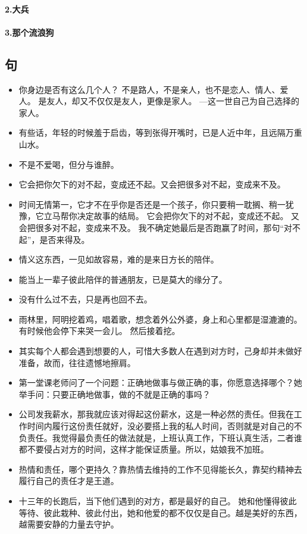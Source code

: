 \documentclass[UTF8,a4paper,8pt]{ctexbook}
\begin{document}
			 \paragraph{2.大兵}
			 \paragraph{3.那个流浪狗}
		 \subsection{句}
			\begin{itemize}
				\item 你身边是否有这么几个人？ 不是路人，不是亲人，也不是恋人、情人、爱人。 是友人，却又不仅仅是友人，更像是家人。 —这一世自己为自己选择的家人。
				\item 有些话，年轻的时候羞于启齿，等到张得开嘴时，已是人近中年，且远隔万重山水。
				\item 不是不爱喝，但分与谁醉。
				\item 它会把你欠下的对不起，变成还不起。又会把很多对不起，变成来不及。
				\item 时间无情第一，它才不在乎你是否还是一个孩子，你只要稍一耽搁、稍一犹豫，它立马帮你决定故事的结局。 它会把你欠下的对不起，变成还不起。 又会把很多对不起，变成来不及。 我不确定她最后是否跑赢了时间，那句“对不起”，是否来得及。
				\item 情义这东西，一见如故容易，难的是来日方长的陪伴。
				\item 能当上一辈子彼此陪伴的普通朋友，已是莫大的缘分了。
				\item 没有什么过不去，只是再也回不去。
				\item 雨林里，阿明挖着鸡，唱着歌，想念着外公外婆，身上和心里都是湿漉漉的。 有时候他会停下来哭一会儿。 然后接着挖。
				\item 其实每个人都会遇到想要的人，可惜大多数人在遇到对方时，己身却并未做好准备，故而，往往遗憾地擦肩。
				\item 第一堂课老师问了一个问题：正确地做事与做正确的事，你愿意选择哪个？她举手问：只要正确地做事，做的不就是正确的事吗？ 
				\item 公司发我薪水，那我就应该对得起这份薪水，这是一种必然的责任。但我在工作时间内履行这份责任就好，没必要搭上我的私人时间，否则就是对自己的不负责任。我觉得最负责任的做法就是，上班认真工作，下班认真生活，二者谁都不要侵占对方的时间，这样才能保证质量。所以，姑娘我不加班。
				\item 热情和责任，哪个更持久？靠热情去维持的工作不见得能长久，靠契约精神去履行自己的责任才是王道。
				\item 十三年的长跑后，当下他们遇到的对方，都是最好的自己。 她和他懂得彼此等待、彼此栽种、彼此付出，她和他爱的都不仅仅是自己。越是美好的东西，越需要安静的力量去守护。

\end{itemize}
\end{document}
